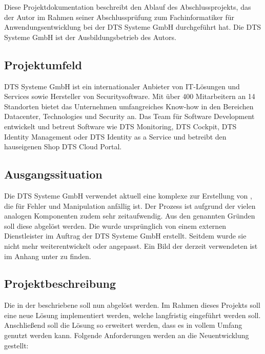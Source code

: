 Diese Projektdokumentation beschreibt den Ablauf des Abschlussprojekts, das der Autor im Rahmen seiner Abschlussprüfung zum Fachinformatiker für Anwendungsentwicklung bei der DTS Systeme GmbH durchgeführt hat. Die DTS Systeme GmbH ist der Ausbildungsbetrieb des Autors.

\subsection{Projektumfeld}
\label{sec:Einführung-Definitionsphase:Projektumfeld}

DTS Systeme GmbH ist ein internationaler Anbieter von IT-Lösungen und Services sowie Hersteller von Securitysoftware. Mit über 400 Mitarbeitern an 14 Standorten bietet das Unternehmen umfangreiches Know-how in den Bereichen Datacenter, Technologies und Security an.
Das Team für Software Development entwickelt und betreut Software wie DTS Monitoring, DTS Cockpit, DTS Identity Management oder DTS Identity as a Service und betreibt den hauseigenen Shop DTS Cloud Portal.

\subsection{Ausgangssituation}
\label{sec:Einführung-Definitionsphase:Ausgangssituation}

Die DTS Systeme GmbH verwendet aktuell eine komplexe  zur Erstellung von , die für Fehler und Manipulation anfällig ist. Der Prozess ist aufgrund der vielen analogen Komponenten zudem sehr zeitaufwendig. Aus den genannten Gründen soll diese  abgelöst werden.
Die  wurde ursprünglich von einem externen Dienstleister im Auftrag der DTS Systeme GmbH erstellt. Seitdem wurde sie nicht mehr weiterentwickelt oder angepasst.
Ein Bild der derzeit verwendeten  ist im Anhang unter  zu finden.


\subsection{Projektbeschreibung}
\label{sec:Einführung-Definitionsphase:Projektbeschreibung}

Die in der  beschriebene  soll nun abgelöst werden.
Im Rahmen dieses Projekts soll eine neue Lösung implementiert werden, welche langfristig eingeführt werden soll. Anschließend soll die Lösung so erweitert werden, dass es in vollem Umfang genutzt werden kann.
Folgende Anforderungen werden an die Neuentwicklung gestellt:

